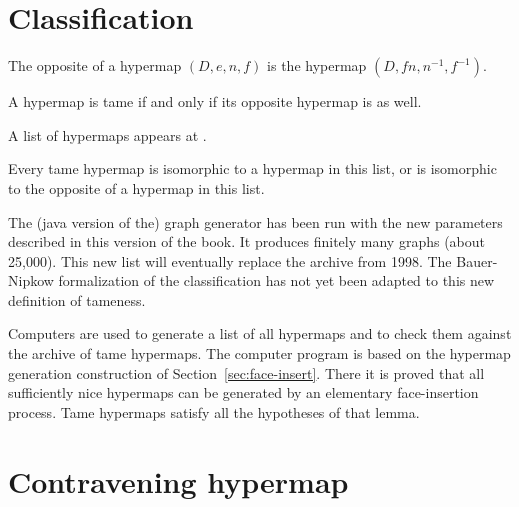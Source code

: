 \section{Classification}
    \label{sec:proof-classification}

\label{sec:classification}




\begin{definition}[opposite] The opposite of a hypermap $(D,e,n,f)$ is the
hypermap $(D,f n,n^{-1},f^{-1})$.
\end{definition}

\begin{lemma}
A hypermap is tame if and only if its opposite hypermap is as well.
\end{lemma}

A list of hypermaps appears at \cite{website:Hales:1998:Code}.

\begin{theorem}
\label{theorem:classification} Every tame hypermap is isomorphic to
a hypermap in this list, or is isomorphic to the opposite of a
hypermap in this list.
\end{theorem}

\begin{note}%
The (java version of the) graph generator has been run with the new parameters described in this version of the book.  It produces finitely many graphs (about 25,000).  This new list will eventually replace the archive from 1998.  The Bauer-Nipkow formalization of the classification has not yet been adapted to this new definition of tameness.
\end{note}


Computers are used to generate a list of all hypermaps and to check
them against the archive of tame hypermaps.  The computer program is
based on the hypermap generation construction of Section~\ref{sec:face-insert}.  There it is
proved that all sufficiently nice hypermaps can be generated by an
elementary face-insertion process.  Tame hypermaps satisfy all the
hypotheses of that lemma.

\section{Contravening hypermap}

